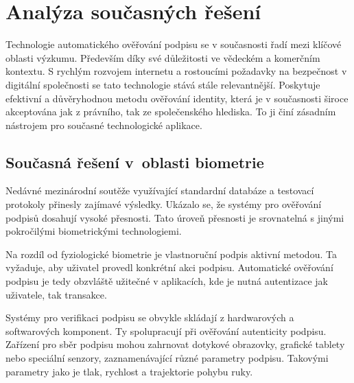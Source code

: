 \chapter{Analýza současných řešení}
Technologie automatického ověřování podpisu se v současnosti řadí mezi klíčové oblasti výzkumu.                                                         %
Především díky své důležitosti ve vědeckém a komerčním kontextu.                                                                                        %
S rychlým rozvojem internetu a rostoucími požadavky na bezpečnost v digitální společnosti se tato technologie stává stále relevantnější.                %
Poskytuje efektivní a důvěryhodnou metodu ověřování identity, která je v současnosti široce akceptována jak z právního, tak ze společenského hlediska.  %
To ji činí zásadním nástrojem pro současné technologické aplikace.                                                                                      %

\section{Současná řešení v~oblasti biometrie}
Nedávné mezinárodní soutěže využívající standardní databáze a testovací protokoly přinesly zajímavé výsledky.   %
Ukázalo se, že systémy pro ověřování podpisů dosahují vysoké přesnosti.                                         %
Tato úroveň přesnosti je srovnatelná s jinými pokročilými biometrickými technologiemi.                          %

Na rozdíl od fyziologické biometrie je vlastnoruční podpis aktivní metodou.                                                   %
Ta vyžaduje, aby uživatel provedl konkrétní akci podpisu.                                                                     %
Automatické ověřování podpisu je tedy obzvláště užitečné v aplikacích, kde je nutná autentizace jak uživatele, tak transakce. %

Systémy pro verifikaci podpisu se obvykle skládají z hardwarových a softwarových komponent.%
Ty spolupracují při ověřování autenticity podpisu. %
Zařízení pro sběr podpisu mohou zahrnovat dotykové obrazovky, grafické tablety nebo speciální senzory, zaznamenávající různé parametry podpisu.%
Takovými parametry jako je tlak, rychlost a trajektorie pohybu ruky. %

